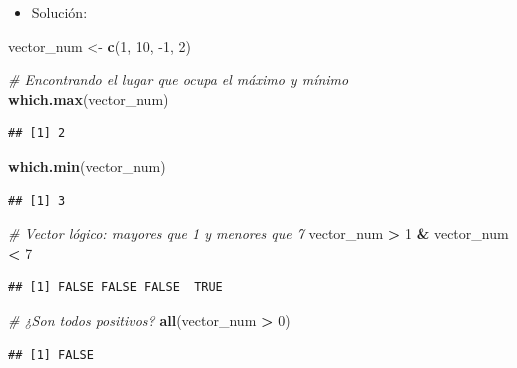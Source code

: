 \documentclass[11pt,]{book}
\newenvironment{Shaded}{\begin{snugshade}}{\end{snugshade}}
\newcommand{\CommentTok}[1]{\textcolor[rgb]{0.37,0.37,0.37}{\textit{#1}}}
\newcommand{\DecValTok}[1]{\textcolor[rgb]{0.06,0.06,0.06}{#1}}
\newcommand{\KeywordTok}[1]{\textcolor[rgb]{0.27,0.27,0.27}{\textbf{#1}}}
\newcommand{\NormalTok}[1]{#1}
\newcommand{\OperatorTok}[1]{\textcolor[rgb]{0.43,0.43,0.43}{\textbf{#1}}}
\newcommand{\StringTok}[1]{\textcolor[rgb]{0.5,0.5,0.5}{#1}}
\providecommand{\tightlist}{%
  \setlength{\itemsep}{0pt}\setlength{\parskip}{0pt}}
\begin{document}
\begin{itemize}
\tightlist
\item
  Solución:
\end{itemize}

\begin{Shaded}
\begin{Highlighting}[]
\NormalTok{vector_num <-}\StringTok{ }\KeywordTok{c}\NormalTok{(}\DecValTok{1}\NormalTok{, }\DecValTok{10}\NormalTok{, }\DecValTok{-1}\NormalTok{, }\DecValTok{2}\NormalTok{)}

\CommentTok{# Encontrando el lugar que ocupa el máximo y mínimo}
\KeywordTok{which.max}\NormalTok{(vector_num)}
\end{Highlighting}
\end{Shaded}

\begin{verbatim}
## [1] 2
\end{verbatim}

\begin{Shaded}
\begin{Highlighting}[]
\KeywordTok{which.min}\NormalTok{(vector_num)}
\end{Highlighting}
\end{Shaded}

\begin{verbatim}
## [1] 3
\end{verbatim}

\begin{Shaded}
\begin{Highlighting}[]
\CommentTok{# Vector lógico: mayores que 1 y menores que 7}
\NormalTok{vector_num }\OperatorTok{>}\StringTok{ }\DecValTok{1} \OperatorTok{&}\StringTok{ }\NormalTok{vector_num }\OperatorTok{<}\StringTok{ }\DecValTok{7}
\end{Highlighting}
\end{Shaded}

\begin{verbatim}
## [1] FALSE FALSE FALSE  TRUE
\end{verbatim}

\begin{Shaded}
\begin{Highlighting}[]
\CommentTok{# ¿Son todos positivos?}
\KeywordTok{all}\NormalTok{(vector_num }\OperatorTok{>}\StringTok{ }\DecValTok{0}\NormalTok{)}
\end{Highlighting}
\end{Shaded}

\begin{verbatim}
## [1] FALSE
\end{verbatim}
\end{document}
